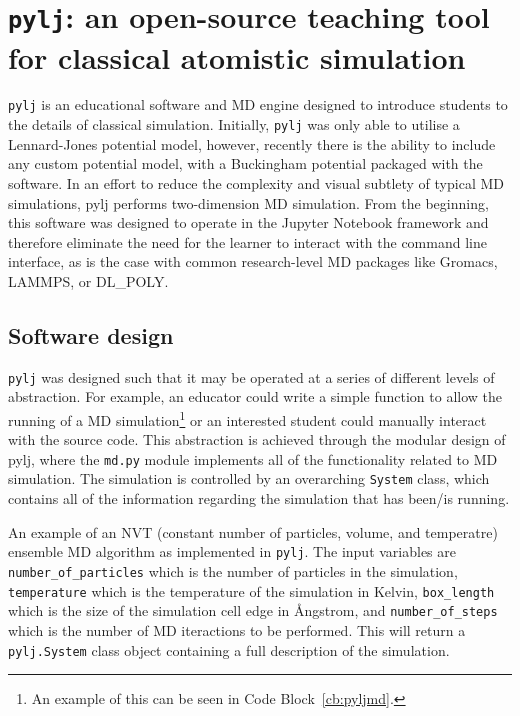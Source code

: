 \section{\texttt{pylj}: an open-source teaching tool for classical atomistic simulation}

\texttt{pylj}\autocite[PYthon Lennard-Jones]{mccluskey_pylj_2018,mccluskey_arm61/pylj_2019-2} is an educational software and MD engine designed to introduce students to the details of classical simulation.
Initially, \texttt{pylj} was only able to utilise a Lennard-Jones potential model,\autocite{lennard-jones_determination_1924} however, recently\autocite{mccluskey_arm61/pylj_2018} there is the ability to include any custom potential model, with a Buckingham potential packaged with the software.\autocite{buckingham_classical_1938}
In an effort to reduce the complexity and visual subtlety of typical MD simulations, pylj performs two-dimension MD simulation.
From the beginning, this software was designed to operate in the Jupyter Notebook framework and therefore eliminate the need for the learner to interact with the command line interface, as is the case with common research-level MD packages like Gromacs, LAMMPS, or DL\_POLY.\autocite{berendsen_gromacs_1995,plimpton_fast_1995,smith_dl_poly_2002}

\subsection{Software design}
\texttt{pylj} was designed such that it may be operated at a series of different levels of abstraction.
For example, an educator could write a simple function to allow the running of a MD simulation\footnote{An example of this can be seen in Code Block~\ref{cb:pyljmd}.} or an interested student could manually interact with the source code.
This abstraction is achieved through the modular design of pylj, where the \texttt{md.py} module implements all of the functionality related to MD simulation.
The simulation is controlled by an overarching \texttt{System} class, which contains all of the information regarding the simulation that has been/is running.
%
\begin{listing}
    \centering
    \caption{An example of an NVT (constant number of particles, volume, and temperatre) ensemble MD algorithm as implemented in \texttt{pylj}. The input variables are \texttt{number\_of\_particles} which is the number of particles in the simulation, \texttt{temperature} which is the temperature of the simulation in Kelvin, \texttt{box\_length} which is the size of the simulation cell edge in \AA ngstrom, and \texttt{number\_of\_steps} which is the number of MD iteractions to be performed. This will return a \texttt{pylj.System} class object containing a full description of the simulation.}
    
    \label{cb:pyljmd}
\end{listing}
%

